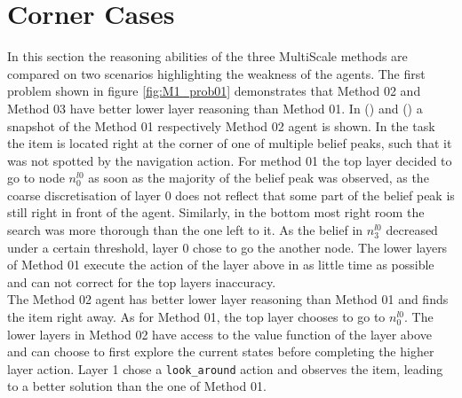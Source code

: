 
\section{Corner Cases}\label{sec:cornercases}
In this section the reasoning abilities of the three MultiScale methods are compared on two scenarios highlighting the weakness of the agents. The first problem shown in figure \ref{fig:M1_prob01} demonstrates that Method 02 and Method 03 have better lower layer reasoning than Method 01. In () and () a snapshot of the Method 01 respectively Method 02 agent is shown. In the task the item is located right at the corner of one of multiple belief peaks, such that it was not spotted by the navigation action. For method 01 the top layer decided to go to node $n_0^{l0}$ as soon as the majority of the belief peak was observed, as the coarse discretisation of layer 0 does not reflect that some part of the belief peak is still right in front of the agent. Similarly, in the bottom most right room the search was more thorough than the one left to it. As the belief in $n_3^{l0}$ decreased under a certain threshold, layer 0 chose to go the another node. The lower layers of Method 01 execute the action of the layer above in as little time as possible and can not correct for the top layers inaccuracy. \\
The Method 02 agent has better lower layer reasoning than Method 01 and finds the item right away. As for Method 01, the top layer chooses to go to $n_0^{l0}$. The lower layers in Method 02 have access to the value function of the layer above and can choose to first explore the current states before completing the higher layer action. Layer 1 chose a \texttt{look\_around} action and observes the item, leading to a better solution than the one of Method 01. \\

